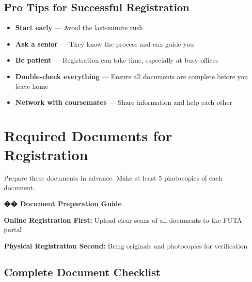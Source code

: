 \documentclass[11pt,a4paper]{article}
\begin{document}
\subsection{Pro Tips for Successful Registration}

\begin{inspirational}
    \begin{itemize}[leftmargin=1.5em, itemsep=0.3em]
        \item \textbf{Start early} --- Avoid the last-minute rush
        \item \textbf{Ask a senior} --- They know the process and can guide you
        \item \textbf{Be patient} --- Registration can take time, especially at busy offices
        \item \textbf{Double-check everything} --- Ensure all documents are complete before you leave home
        \item \textbf{Network with coursemates} --- Share information and help each other
    \end{itemize}
\end{inspirational}

\newpage
\section{Required Documents for Registration}

Prepare these documents in advance. Make at least 5 photocopies of each document.

\begin{inspirational}
    \textbf{\color{primary}\Large �� Document Preparation Guide}

    \vspace{0.5em}

    \textbf{Online Registration First:} Upload clear scans of all documents to the FUTA portal

    \vspace{0.3em}

    \textbf{Physical Registration Second:} Bring originals and photocopies for verification
\end{inspirational}

\subsection*{Complete Document Checklist}
\end{document}
